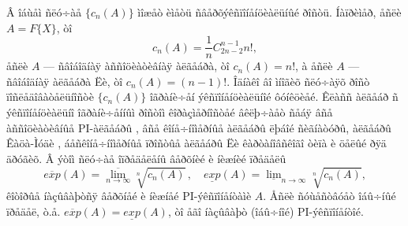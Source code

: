\documentclass{article}
\numberwithin{equation}{section}
\theoremstyle{plain}
\theoremstyle{definition}
\begin{document}
\begin{fulltext}
Â îáùåì ñëó÷àå $\{c_n(A)\}$ ìîæåò èìåòü ñâåðõýêñïîíåíöèàëüíûé ðîñòü. Íàïðèìåð,
åñëè $A=F\{X\}$, òî
$$
c_n(A)=\frac{1}{n}C_{2n-2}^{n-1} n!,
$$
åñëè $A$ --- ñâîáîäíàÿ àññîöèàòèâíàÿ àëãåáðà, òî $c_n(A)=n!$, à åñëè $A$ ---
ñâîáîäíàÿ àëãåáðà Ëè, òî $c_n(A)=(n-1)!$. Îäíàêî âî ìíîãèõ ñëó÷àÿõ ðîñò ïîñëåäîâàòåëüíîñòè 
$\{c_n(A)\}$ îãðàíè÷åí ýêñïîíåíöèàëüíîé ôóíêöèåé. Êëàññ àëãåáð ñ ýêñïîíåíöèàëüíî îãðàíè÷åííûì
ðîñòîì êîðàçìåðíîñòåé âêëþ÷àåò ñåáÿ âñå àññîöèàòèâíûå PI-àëãåáðû \cite{R1}, âñå 
êîíå÷íîìåðíûå àëãåáðû \cite{BD} ëþáîé ñèãíàòóðû, àëãåáðû Êàöà-Ìóäè \cite{Z2}, 
áåñêîíå÷íîìåðíûå ïðîñòûå àëãåáðû Ëè êàðòàíîâñêîãî òèïà \cite{M} è öåëûé ðÿä äðóãèõ.
Â ýòîì ñëó÷àå îïðåäåëåíû âåðõíèé è íèæíèé ïðåäåëû
$$
\overline{exp}(A) =\overline{\lim_{n\to\infty}}\sqrt[n]{c_n(A)}\, ,\quad
\underline{exp}(A)= \underline{\lim}_{n\to\infty}\sqrt[n]{c_n(A)},
$$
êîòîðûå íàçûâàþòñÿ âåðõíåé è íèæíåé PI-ýêñïîíåíòàìè $A$. Åñëè ñóùåñòâóåò îáû÷íûé
ïðåäåë, ò.å. $\overline{exp}(A)=\underline{exp}(A)$, òî åãî íàçûâàþò (îáû÷íîé)
PI-ýêñïîíåíòîé.


\end{fulltext}
\end{document}
